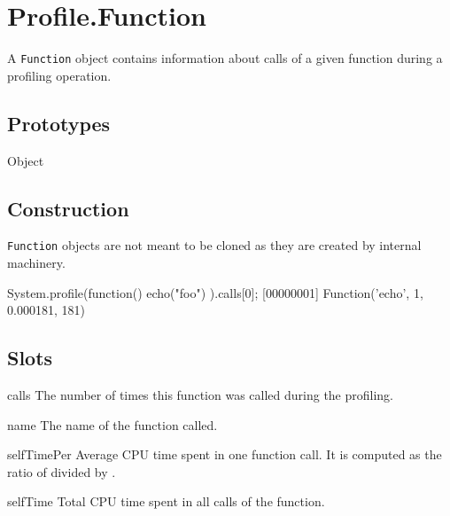 
\section{Profile.Function}

A \lstinline|Function| object contains information about calls of a
given function during a profiling operation.

\subsection{Prototypes}

\begin{refObjects}
\item[Object]
\end{refObjects}

\subsection{Construction}

\lstinline|Function| objects are not meant to be cloned as they are
created by  internal machinery.

\begin{urbiscript}
System.profile(function() { echo("foo") }).calls[0];
[00000001] Function('echo', 1, 0.000181, 181)
\end{urbiscript}

\subsection{Slots}

\begin{urbiscriptapi}

\item[calls]%
  The number of times this function was called during the profiling.

\item[name]%
  The name of the function called.

\item[selfTimePer]%
  Average CPU time spent in one function call. It is computed as the ratio
  of  divided by .

\item[selfTime]%
  Total CPU time spent in all calls of the function.

\end{urbiscriptapi}


